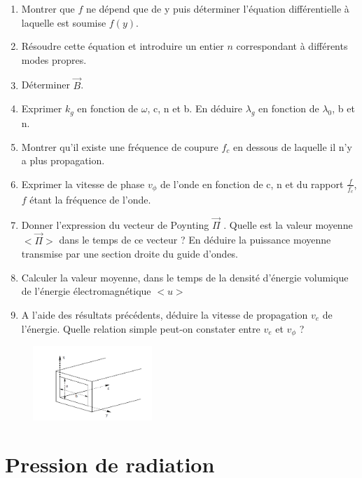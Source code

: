 \documentclass{article}
\begin{document}
\begin{enumerate}
    \item Montrer que $f$ ne dépend que de y puis déterminer l'équation différentielle à laquelle est soumise $f(y)$.
    \item Résoudre cette équation et introduire un entier $n$ correspondant à différents modes propres. 
    \item Déterminer $\vec{B}$.
    \item Exprimer $k_g$ en fonction de $\omega$, c, n et b. En déduire $\lambda_g$ en fonction de $\lambda_0$, b et n.
    \item Montrer qu’il existe une fréquence de coupure $f_c$ en dessous de laquelle il n’y a plus propagation.
    \item Exprimer la vitesse de phase $v_\phi$ de l’onde en fonction de c, n et du rapport $\frac{f}{f_c}$, $f$ étant la fréquence de l'onde.
    \item  Donner l’expression du vecteur de Poynting $\vec{\Pi}$ . Quelle est
    la valeur moyenne  $<\vec{\Pi}>$ dans le temps de ce vecteur ?
    En déduire la puissance moyenne transmise par une section droite du guide d’ondes.
    \item Calculer la valeur moyenne, dans le temps de la densité d’énergie volumique de l’énergie
    électromagnétique $<u>$
    \item A l’aide des résultats précédents, déduire la vitesse de propagation $v_e$ de l’énergie.
    Quelle relation simple peut-on constater entre $v_e $ et $v_\phi$ ? \\[2cm]
\end{enumerate}


\begin{figure}[h]
  \centering
  \includegraphics[width=0.4\textwidth]{schéma_guide_d'ondes.png}
  \label{fig:schéma_guide_'ondes}
\end{figure}


\section{Pression de radiation}
\end{document}
